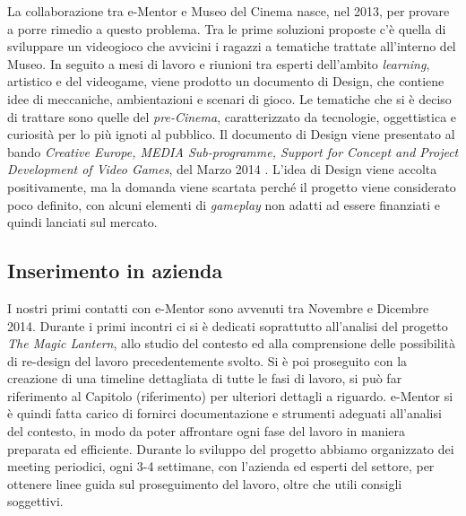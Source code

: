 La collaborazione tra e-Mentor e Museo del Cinema nasce, nel 2013, per provare a porre rimedio a questo problema.
Tra le prime soluzioni proposte c’è quella di sviluppare un videogioco che avvicini i ragazzi a tematiche trattate all’interno del Museo. In seguito a mesi di lavoro e riunioni tra esperti dell’ambito \textit{learning}, artistico e del videogame, viene prodotto un documento di Design, che contiene idee di meccaniche, ambientazioni e scenari di gioco. Le tematiche che si è deciso di trattare sono quelle del \textit{pre-Cinema}, caratterizzato da tecnologie, oggettistica e curiosità per lo più ignoti al pubblico.
Il documento di Design viene presentato al bando \textit{Creative Europe, MEDIA Sub-programme, Support for Concept and Project Development of Video Games}, del Marzo 2014 \cite{CreativeEurope}.
L’idea di Design viene accolta positivamente, ma la domanda viene scartata perché il progetto viene considerato poco definito, con alcuni elementi di \textit{gameplay} non adatti ad essere finanziati e quindi lanciati sul mercato.

\subsection{Inserimento in azienda}
\label{sec:azienda_inserimento}

I nostri primi contatti con e-Mentor sono avvenuti tra Novembre e Dicembre 2014. Durante i primi incontri ci si è dedicati soprattutto all'analisi del progetto \textit{The Magic Lantern}, allo studio del contesto ed alla comprensione delle possibilità di re-design del lavoro precedentemente svolto.
Si è poi proseguito con la creazione di una timeline dettagliata di tutte le fasi di lavoro, si può far riferimento al Capitolo (riferimento) per ulteriori dettagli a riguardo.
e-Mentor si è quindi fatta carico di fornirci documentazione e strumenti adeguati all'analisi del contesto, in modo da poter affrontare ogni fase del lavoro in maniera preparata ed efficiente.
Durante lo sviluppo del progetto abbiamo organizzato dei meeting periodici, ogni 3-4 settimane, con l'azienda ed esperti del settore, per ottenere linee guida sul proseguimento del lavoro, oltre che utili consigli soggettivi.
